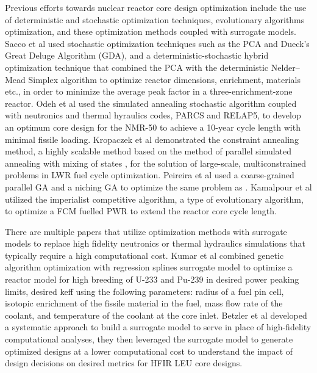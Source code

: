 Previous efforts towards nuclear reactor core design optimization include the use 
of deterministic and stochastic optimization techniques, evolutionary algorithms 
optimization, and these optimization methods coupled with surrogate models. 
Sacco et al \cite{sacco_two_2006,sacco_metropolis_2008} used stochastic 
optimization techniques such as the \gls{PCA} and Dueck's Great Deluge 
Algorithm (GDA), and a deterministic-stochastic hybrid optimization technique
that combined the \gls{PCA} with the deterministic Nelder–Mead Simplex algorithm
to optimize reactor dimensions, enrichment, materials etc., 
in order to minimize the average peak factor in a three-enrichment-zone reactor. 
Odeh et al \cite{odeh_core_2016} used the simulated annealing stochastic algorithm 
coupled with neutronics and thermal hyraulics codes, \gls{PARCS} and RELAP5, 
to develop an optimum core design for the \gls{NMR-50} to achieve a 10-year cycle length 
with minimal fissile loading. 
Kropaczek et al \cite{kropaczek_large-scale_2019} demonstrated the constraint 
annealing method, a highly scalable method based on the method of parallel 
simulated annealing with mixing of states \cite{kropaczek_constraint_2019}, for 
the solution of large-scale, multiconstrained problems in \gls{LWR} fuel cycle 
optimization. 
Peireira et al \cite{pereira_coarse-grained_2003,pereira_parallel_2008} 
used a coarse-grained parallel \gls{GA} and a niching \gls{GA}
to optimize the same problem as \cite{sacco_two_2006}. 
Kamalpour et al \cite{kamalpour_smart_2020} utilized the imperialist competitive 
algorithm, a type of evolutionary algorithm, to optimize a \gls{FCM} fuelled 
\gls{PWR} to extend the reactor core cycle length. 

There are multiple papers that utilize optimization methods with surrogate models 
to replace high fidelity neutronics or thermal hydraulics simulations that 
typically require a high computational cost. 
Kumar et al \cite{kumar_new_2015} combined genetic algorithm optimization 
with regression splines surrogate model to optimize a reactor model for 
high breeding of U-233 and Pu-239 in desired power peaking limits, desired 
keff using the following parameters: radius of a fuel pin cell, isotopic enrichment 
of the fissile material in the fuel, mass flow rate of the coolant, and temperature 
of the coolant at the core inlet.
Betzler et al \cite{betzler_design_2019} developed a systematic approach to 
build a surrogate model to serve in place of high-fidelity computational 
analyses, they then leveraged the surrogate model to generate optimized designs 
at a lower computational cost to understand the impact of design decisions on 
desired metrics for \gls{HFIR} \gls{LEU} core designs. 

